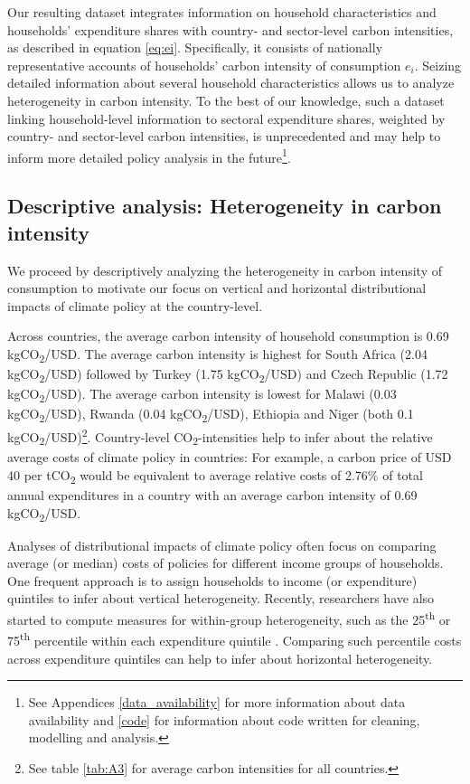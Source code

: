 \documentclass[12pt, a4paper]{article}
\begin{document}
Our resulting dataset integrates information on household characteristics and households' expenditure shares with country- and sector-level carbon intensities, as described in equation \ref{eq:ei}. Specifically, it consists of nationally representative accounts of households' carbon intensity of consumption $e_{i}$. Seizing detailed information about several household characteristics allows us to analyze heterogeneity in carbon intensity. To the best of our knowledge, such a dataset linking household-level information to sectoral expenditure shares, weighted by country- and sector-level carbon intensities, is unprecedented and may help to inform more detailed policy analysis in the future\footnote{See Appendices \ref{data_availability} for more information about data availability and \ref{code} for information about code written for cleaning, modelling and analysis.}.

\subsection{Descriptive analysis: Heterogeneity in carbon intensity} \label{sec:descriptive}

We proceed by descriptively analyzing the heterogeneity in carbon intensity of consumption to motivate our focus on vertical and horizontal distributional impacts of climate policy at the country-level.

Across countries, the average carbon intensity of household consumption is 0.69 kgCO\textsubscript{2}/USD. The average carbon intensity is highest for South Africa (2.04 kgCO\textsubscript{2}/USD) followed by Turkey (1.75 kgCO\textsubscript{2}/USD) and Czech Republic (1.72 kgCO\textsubscript{2}/USD). The average carbon intensity is lowest for Malawi (0.03 kgCO\textsubscript{2}/USD), Rwanda (0.04 kgCO\textsubscript{2}/USD), Ethiopia and Niger (both 0.1 kgCO\textsubscript{2}/USD)\footnote{See table \ref{tab:A3} for average carbon intensities for all countries.}. Country-level CO\textsubscript{2}-intensities help to infer about the relative average costs of climate policy in countries: For example, a carbon price of USD 40 per tCO\textsubscript{2} \autocite{Stiglitz.2017} would be equivalent to average relative costs of 2.76\% of total annual expenditures in a country with an average carbon intensity of 0.69 kgCO\textsubscript{2}/USD.

Analyses of distributional impacts of climate policy often focus on comparing average (or median) costs of policies for different income groups of households. One frequent approach is to assign households to income (or expenditure) quintiles to infer about vertical heterogeneity. Recently, researchers have also started to compute measures for within-group heterogeneity, such as the 25\textsuperscript{th} or 75\textsuperscript{th} percentile within each expenditure quintile \autocite{Cronin.2019, Missbach.2024}. Comparing such percentile costs across expenditure quintiles can help to infer about horizontal heterogeneity.
\end{document}
